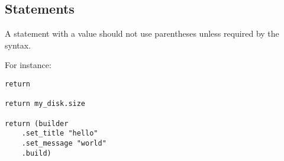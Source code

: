 \subsection{ Statements}

A  statement with a value should not use parentheses unless required by the syntax.

\example For instance: 
\begin{lstlisting}
return

return my_disk.size

return (builder
    .set_title "hello"
    .set_message "world"
    .build)
\end{lstlisting}














